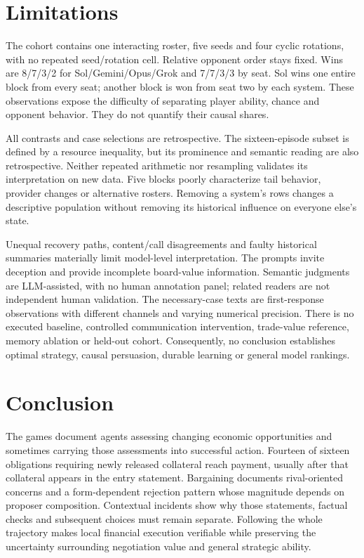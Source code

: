 \section{Limitations}
The cohort contains one interacting roster, five seeds and four cyclic rotations, with no repeated seed/rotation cell. Relative opponent order stays fixed. Wins are 8/7/3/2 for Sol/Gemini/Opus/Grok and 7/7/3/3 by seat. Sol wins one entire block from every seat; another block is won from seat two by each system. These observations expose the difficulty of separating player ability, chance and opponent behavior. They do not quantify their causal shares.

All contrasts and case selections are retrospective. The sixteen-episode subset is defined by a resource inequality, but its prominence and semantic reading are also retrospective. Neither repeated arithmetic nor resampling validates its interpretation on new data. Five blocks poorly characterize tail behavior, provider changes or alternative rosters. Removing a system's rows changes a descriptive population without removing its historical influence on everyone else's state.

Unequal recovery paths, content/call disagreements and faulty historical summaries materially limit model-level interpretation. The prompts invite deception and provide incomplete board-value information. Semantic judgments are LLM-assisted, with no human annotation panel; related readers are not independent human validation. The necessary-case texts are first-response observations with different channels and varying numerical precision. There is no executed baseline, controlled communication intervention, trade-value reference, memory ablation or held-out cohort. Consequently, no conclusion establishes optimal strategy, causal persuasion, durable learning or general model rankings.

\section{Conclusion}
The games document agents assessing changing economic opportunities and sometimes carrying those assessments into successful action. Fourteen of sixteen obligations requiring newly released collateral reach payment, usually after that collateral appears in the entry statement. Bargaining documents rival-oriented concerns and a form-dependent rejection pattern whose magnitude depends on proposer composition. Contextual incidents show why those statements, factual checks and subsequent choices must remain separate. Following the whole trajectory makes local financial execution verifiable while preserving the uncertainty surrounding negotiation value and general strategic ability.
